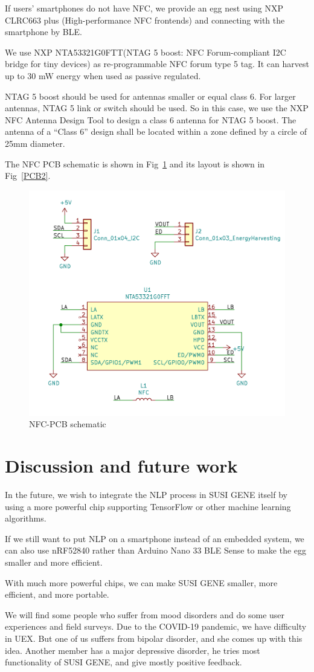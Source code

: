 \documentclass[manuscript,screen]{acmart}
\begin{document}
If users' smartphones do not have NFC, we provide an egg nest using NXP CLRC663 plus (High-performance NFC frontends) and connecting with the smartphone by BLE.

We use NXP NTA53321G0FTT(NTAG 5 boost: NFC Forum-compliant I2C bridge for tiny devices) as re-programmable NFC forum type 5 tag. It can harvest up to 30 mW energy when used as passive regulated.

NTAG 5 boost should be used for antennas smaller or equal class 6. For larger antennas, NTAG 5 link or switch should be used. So in this case, we use the NXP NFC Antenna Design Tool to design a class 6 antenna for NTAG 5 boost. The antenna of a “Class 6” design shall be located within a zone defined by a circle of 25mm diameter.

The NFC PCB schematic is shown in Fig~\ref{PCBsch2} and its layout is shown in Fig~\ref{PCB2}.

\begin{figure}[h]
  \centering
  \includegraphics[width=0.7\linewidth]{PCBsch2.png}
  \caption{NFC-PCB schematic}
  \label{PCBsch2}
\end{figure}

\section{Discussion and future work}

In the future, we wish to integrate the NLP process in SUSI GENE itself by using a more powerful chip supporting TensorFlow or other machine learning algorithms. 

If we still want to put NLP on a smartphone instead of an embedded system, we can also use nRF52840 rather than Arduino Nano 33 BLE Sense to make the egg smaller and more efficient.

With much more powerful chips, we can make SUSI GENE smaller, more efficient, and more portable. 

We will find some people who suffer from mood disorders and do some user experiences and field surveys. Due to the COVID-19 pandemic, we have difficulty in UEX. But one of us suffers from bipolar disorder, and she comes up with this idea. Another member has a major depressive disorder, he tries most functionality of SUSI GENE, and give mostly positive feedback.



\end{document}
